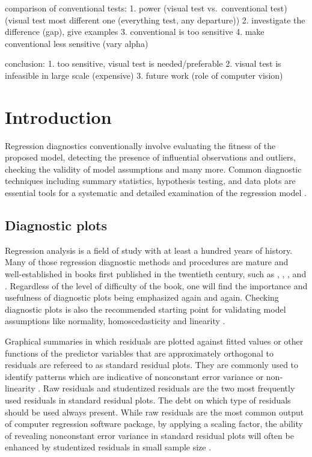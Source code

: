 \documentclass[]{interact}
\theoremstyle{plain}%
\theoremstyle{definition}
\theoremstyle{remark}
\begin{document}
comparison of conventional tests: 1. power (visual test vs.~conventional
test) (visual test most different one (everything test, any departure))
2. investigate the difference (gap), give examples 3. conventional is
too sensitive 4. make conventional less sensitive (vary alpha)

conclusion: 1. too sensitive, visual test is needed/preferable 2. visual
test is infeasible in large scale (expensive) 3. future work (role of
computer vision)

\hypertarget{introduction}{%
\section{Introduction}\label{introduction}}

Regression diagnostics conventionally involve evaluating the fitness of
the proposed model, detecting the presence of influential observations
and outliers, checking the validity of model assumptions and many more.
Common diagnostic techniques including summary statistics, hypothesis
testing, and data plots are essential tools for a systematic and
detailed examination of the regression model
\citep{mansfield1987diagnostic}.

\hypertarget{diagnostic-plots}{%
\subsection{Diagnostic plots}\label{diagnostic-plots}}

Regression analysis is a field of study with at least a hundred years of
history. Many of those regression diagnostic methods and procedures are
mature and well-established in books first published in the twentieth
century, such as \citet{draper_applied_2014},
\citet{montgomery_introduction_2012}, \citet{belsley_regression_1980},
\citet{cook_applied_1999} and \citet{cook1982residuals}. Regardless of
the level of difficulty of the book, one will find the importance and
usefulness of diagnostic plots being emphasized again and again.
Checking diagnostic plots is also the recommended starting point for
validating model assumptions like normality, homoscedasticity and
linearity \citep{anscombe_examination_1963}.

Graphical summaries in which residuals are plotted against fitted values
or other functions of the predictor variables that are approximately
orthogonal to residuals are refereed to as standard residual plots. They
are commonly used to identify patterns which are indicative of
nonconstant error variance or non-linearity \citep{cook1982residuals}.
Raw residuals and studentized residuals are the two most frequently used
residuals in standard residual plots. The debt on which type of
residuals should be used always present. While raw residuals are the
most common output of computer regression software package, by applying
a scaling factor, the ability of revealing nonconstant error variance in
standard residual plots will often be enhanced by studentized residuals
in small sample size \citep{gunst2018regression}.
\end{document}
